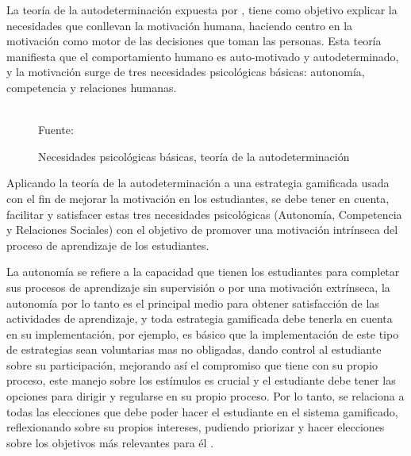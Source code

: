 La teoría de la autodeterminación expuesta por , tiene como objetivo explicar la 
necesidades que conllevan la motivación humana, haciendo centro en la motivación como motor de las decisiones 
que toman las personas. Esta teoría manifiesta que el comportamiento humano es auto-motivado y
autodeterminado, y la motivación surge de tres necesidades psicológicas básicas: autonomía, competencia y 
relaciones humanas.

\begin{figure}[ht]
\caption{Necesidades psicológicas básicas, teoría de la autodeterminación}
\label{img:SDT}
\centering
{}
\\
{\footnotesize Fuente: \citeA<basada en>{deci1985intrinsic}}
\end{figure}

Aplicando la teoría de la autodeterminación a una estrategia gamificada usada con el fin de mejorar la 
motivación en los estudiantes, se debe tener en cuenta, facilitar y satisfacer estas tres necesidades 
psicológicas (Autonomía, Competencia y Relaciones Sociales) con el objetivo de promover una motivación 
intrínseca del proceso de aprendizaje de los estudiantes. 

La autonomía se refiere a la capacidad que tienen los estudiantes para completar sus procesos de aprendizaje 
sin supervisión o por una motivación extrínseca, la autonomía por lo tanto es el principal medio para 
obtener satisfacción de las actividades de aprendizaje, y toda estrategia gamificada debe tenerla en cuenta en 
su implementación, por ejemplo, es básico que la implementación de este tipo de estrategias sean voluntarias 
mas no obligadas, dando control al estudiante sobre su participación, mejorando así el compromiso que tiene 
con su propio proceso, este manejo sobre los estímulos es crucial y el estudiante debe tener las opciones 
para dirigir y regularse en su propio proceso. Por lo tanto, se relaciona a todas las elecciones que debe 
poder hacer el estudiante en el sistema gamificado, reflexionando sobre su propios intereses, pudiendo 
priorizar y hacer elecciones sobre los objetivos más relevantes para él \cite{Rutledge2018}.

